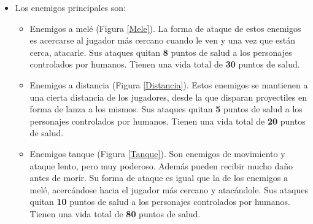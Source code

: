 \begin{itemize}
\item Los enemigos principales son:
\begin{itemize}
\item Enemigos a melé (Figura \ref{Mele}). La forma de ataque de estos enemigos es acercarse al jugador más cercano cuando le ven y una vez que están cerca, atacarle. Sus ataques quitan \textbf{8} puntos de salud a los personajes controlados por humanos. Tienen una vida total de \textbf{30} puntos de salud.
\item Enemigos a distancia (Figura \ref{Distancia}). Estos enemigos se mantienen a una cierta distancia de los jugadores, desde la que disparan proyectiles en forma de lanza a los mismos. Sus  ataques quitan \textbf{5} puntos de salud a los personajes controlados por humanos. Tienen una vida total de \textbf{20} puntos de salud.
\item Enemigos tanque (Figura \ref{Tanque}). Son enemigos de movimiento y ataque lento, pero muy poderoso. Además pueden recibir mucho daño antes de morir. Su forma de ataque es igual que la de los enemigos a melé, acercándose hacia el jugador más cercano y atacándole. Sus ataques quitan \textbf{10} puntos de salud a los personajes controlados por humanos. Tienen una vida total de \textbf{80} puntos de salud.
\end{itemize}


\end{itemize}
